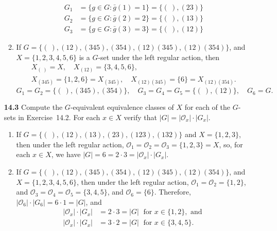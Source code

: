 \documentclass[12pt,reqno]{amsart}
\newcommand{\<}{\ensuremath{\langle}}
\renewcommand{\>}{\ensuremath{\rangle}}
\begin{document}
\begin{enumerate}
\begin{enumerate}

   \begin{align*}
     G_1 &= \{g\in G : \bar{g}(1) = 1\} = \{(~), (23)\}\\
     G_2 &= \{g\in G : \bar{g}(2) = 2\} = \{(~), (13)\}\\
     G_3 &= \{g\in G : \bar{g}(3) = 3\} = \{(~), (12)\}
   \end{align*}

\bigskip
 
 \item If
$G = \{(~), (12), (345), (354), (12)(345), (12)(354)  \}$, and 
$X = \{1, 2, 3, 4, 5, 6\}$ is a $G$-set under the left regular action, then
\begin{gather*}
  X_{(~)} = X, \quad X_{(12)} =\{3,4,5,6\}, \\
  X_{(345)} =  \{1, 2, 6\} = X_{(345)}, \quad
  X_{(12)(345)} = \{6\} = X_{(12)(354)}.
\end{gather*}
\[
  G_1  = G_2 = \{(~), (345), (354)\}, \quad
  G_3= G_4 = G_5 = \{(~), (12)\} , \quad
  G_6 = G.
\]
\end{enumerate}
 
\bigskip

\item[{\bf 14.3}]
Compute the $G$-equivalent equivalence classes of $X$ for each of the $G$-sets in
Exercise~14.2. For each $x \in X$ verify that 
$|G|=|{\mathcal O}_x| \cdot |G_x|$.  

\medskip


\begin{enumerate}
 \item If
$G=\{(~), (12), (13), (23), (123), (132)  \}$ and 
$X= \{1, 2, 3\}$, then under the left regular action,
$     \mathcal{O}_1 =      \mathcal{O}_2 =      \mathcal{O}_3 = \{1,2,3\} = X$,
so, for each $x \in X$, we have $|G| = 6 = 2\cdot 3 = |\mathcal{O}_x|\cdot |G_x|$.

\bigskip
 
 \item If
$G = \{(~), (12), (345), (354), (12)(345), (12)(354)  \}$, and 
$X = \{1, 2, 3, 4, 5, 6\}$, then under the left regular action,
$ \mathcal{O}_1 = \mathcal{O}_2=\{1, 2\}$, and 
$\mathcal{O}_3 = \mathcal{O}_4 = \mathcal{O}_5= \{3,4,5\}$, and 
$\mathcal{O}_6 = \{6\}$.
Therefore, $  |\mathcal{O}_6|\cdot |G_6|  = 6\cdot 1= |G|$, and
\begin{align*}
|\mathcal{O}_x|\cdot |G_x| &= 2\cdot 3  =   |G| \; \text{ for } x \in \{1, 2\}, \text{ and }\\
 |\mathcal{O}_x|\cdot |G_x| &= 3\cdot 2 =   |G|  \; \text{ for } x \in \{3, 4, 5\}.
\end{align*}
\end{enumerate}



\end{enumerate}
\end{document}
